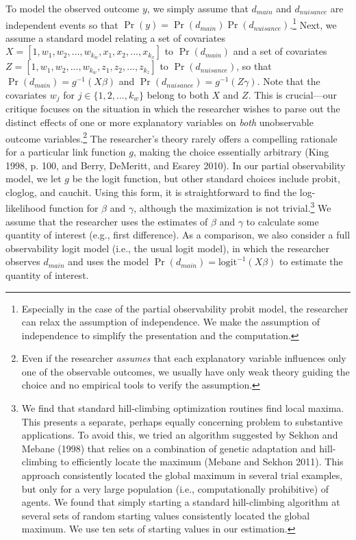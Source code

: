 \documentclass[10pt]{article}
\begin{document}
To model the observed outcome $y$, we simply assume that $d_{main}$ and $d_{nuisance}$ are independent events so that $\Pr(y) = \Pr(d_{main})\Pr(d_{nuisance})$.\footnote{Especially in the case of the partial observability probit model, the researcher can relax the assumption of independence. 
We make the assumption of independence to simplify the presentation and the computation.} 
Next, we assume a standard model relating a set of covariates $X = [1, w_1, w_2,..., w_{k_w}, x_1, x_2,..., x_{k_x}]$ to $\Pr(d_{main})$ and a set of covariates $Z = [1, w_1, w_2,..., w_{k_w}, z_1, z_2,..., z_{k_z}]$ to $\Pr(d_{nuisance})$, so that $\Pr(d_{main}) = g^{-1}(X\beta)$ and $\Pr(d_{nuisance}) = g^{-1}(Z\gamma)$.
Note that the covariates $w_j$ for $j \in \{1, 2,..., k_w\}$ belong to both $X$ and $Z$. 
This is crucial---our critique focuses on the situation in which the researcher wishes to parse out the distinct effects of one or more explanatory variables on \textit{both} unobservable outcome variables.\footnote{Even if the researcher \textit{assumes} that each explanatory variable influences only one of the observable outcomes, we usually have only weak theory guiding the choice and no empirical tools to verify the assumption.} 
The researcher's theory rarely offers a compelling rationale for a particular link function $g$, making the choice essentially arbitrary (King 1998, p. 100, and Berry, DeMeritt, and Esarey 2010).
In our partial observability model, we let $g$ be the logit function, but other standard choices include probit, cloglog, and cauchit.
Using this form, it is straightforward to find the log-likelihood function for $\beta$ and $\gamma$, although the maximization is not trivial.\footnote{We find that standard hill-climbing optimization routines find local maxima. 
This presents a separate, perhaps equally concerning problem to substantive applications. 
To avoid this, we tried an algorithm suggested by Sekhon and Mebane (1998) that relies on a combination of genetic adaptation and hill-climbing to efficiently locate the maximum (Mebane and Sekhon 2011). 
This approach consistently located the global maximum in several trial examples, but only for a very large population (i.e., computationally prohibitive) of agents. 
We found that simply starting a standard hill-climbing algorithm at several sets of random starting values consistently located the global maximum. 
We use ten sets of starting values in our estimation.} 
We assume that the researcher uses the estimates of $\beta$ and $\gamma$ to calculate some quantity of interest (e.g., first difference). 
As a comparison, we also consider a full observability logit model (i.e., the usual logit model), in which the researcher observes $d_{main}$ and uses the model $\Pr(d_{main}) = \text{logit}^{-1}(X\beta)$ to estimate the quantity of interest.
\end{document}
